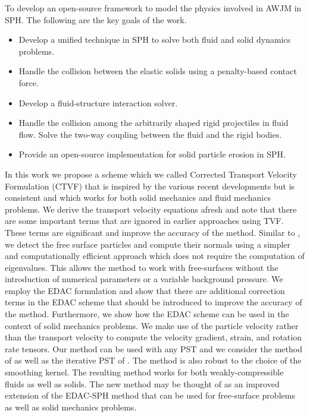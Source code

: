 To develop an open-source framework to model the physics involved in AWJM in SPH.
The following are the key goals of the work.
\begin{itemize}
\item Develop a unified technique in SPH to solve both fluid and solid dynamics
  problems.
\item Handle the collision between the elastic solids using a penalty-based contact force.
\item Develop a fluid-structure interaction solver.
\item Handle the collision among the arbitrarily shaped rigid projectiles in fluid
  flow. Solve the two-way coupling between the fluid and the rigid bodies.
\item Provide an open-source implementation for solid particle erosion in SPH.
\end{itemize}


In this work we propose a scheme which we called Corrected Transport Velocity
Formulation (CTVF) that is inspired by the various recent developments but is
consistent and which works for both solid mechanics and fluid mechanics
problems. We derive the transport velocity equations afresh and note that
there are some important terms that are ignored in earlier approaches using
TVF. These terms are significant and improve the accuracy of the method.
Similar to \cite{oger_ale_sph_2016,sun_consistent_2019}, we detect the free
surface particles and compute their normals using a simpler and
computationally efficient approach which does not require the computation of
eigenvalues. This allows the method to work with free-surfaces without the
introduction of numerical parameters or a variable background pressure. We
employ the EDAC formulation and show that there are additional correction
terms in the EDAC scheme that should be introduced to improve the accuracy of
the method. Furthermore, we show how the EDAC scheme can be used in the
context of solid mechanics problems. We make use of the particle velocity
rather than the transport velocity to compute the velocity gradient, strain,
and rotation rate tensors. Our method can be used with any PST and we consider
the method of \citet{sun_consistent_2019} as well as the iterative PST of
\citet{huang_kernel_2019}. The method is also robust to the choice of the
smoothing kernel. The resulting method works for both weakly-compressible
fluids as well as solids. The new method may be thought of as an improved
extension of the EDAC-SPH method that can be used for free-surface problems as
well as solid mechanics problems.


